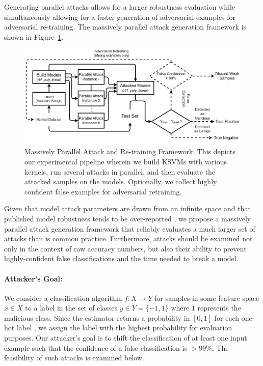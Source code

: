 \documentclass[runningheads]{llncs}
\begin{document}
Generating parallel attacks allows for a larger robustness evaluation while simultaneously allowing for a faster generation of adversarial examples for adversarial re-training. The massively parallel attack generation framework is shown in Figure~\ref{fig:attack_framework}.


\begin{figure}[!htb]
\centering
\includegraphics[width=\textwidth]{./generated/PPGD.png}
\caption{Massively Parallel Attack and Re-training Framework.  This depicts our experimental pipeline wherein we build KSVMs with various kernels, run several attacks in parallel, and then evaluate the attacked samples on the models. Optionally, we collect highly confident false examples for adversarial retraining.}
\label{fig:attack_framework}

\end{figure}

Given that model attack parameters are drawn from an infinite space and that published model robustness tends to be over-reported \cite{croce2020reliable}, we propose a massively parallel attack generation framework that reliably evaluates a much larger set of attacks than is common practice. Furthermore, attacks should be examined not only in the context of raw accuracy numbers, but also their ability to prevent highly-confident false classifications and the time needed to break a model. 


\paragraph{Attacker's Goal: }


We consider a classification algorithm $f: X \rightarrow Y $ for samples in some feature space $x \in X$ to a label in the set of classes $y \in Y = \{ -1, 1\}$ where $1$ represents the malicious class. Since the estimator returns a probability in $[0,1]$ for each one-hot label \cite{scikit-learn}, we assign the label with the highest probability for evaluation purposes. Our attacker's goal is to shift the classification of at least one input example such that the confidence of a false classification is $>99\%$. The feasibility of such attacks is examined below.
\end{document}

